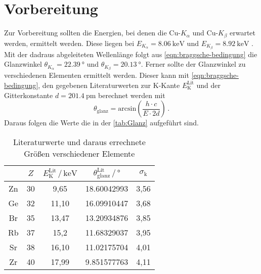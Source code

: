 \section{Vorbereitung}
\label{sec:vorb}
Zur Vorbereitung sollten die Energien, bei denen die Cu-$K_\alpha$ und Cu-$K_\beta$
erwartet werden, ermittelt werden. Diese liegen bei $E_{K_\alpha} = \SI{8.06}{\kilo\eV}$ und 
$E_{K_\beta} = \SI{8.92}{\kilo\eV}$ \cite{ld-didactic.de}. Mit der dadraus abgeleiteten Wellenlänge folgt aus
\autoref{eqn:braggsche-bedingung} die Glanzwinkel $\theta_{K_\alpha} = \SI{22.39}{\degree}$ 
und $\theta_{K_\beta} = \SI{20.13}{\degree}$.
Ferner sollte der Glanzwinkel zu verschiedenen Elementen ermittelt 
werden. Dieser kann mit \autoref{eqn:braggsche-bedingung}, den gegebenen Literaturwerten 
zur K-Kante $E_\text{K}^\text{Lit}$ \cite{wissen} und der Gitterkonstante 
$d = \SI{201.4}{\pico\meter}$ berechnet werden mit 
\begin{equation}
	\theta_\text{glanz} = \text{arcsin}\left(\frac{h \cdot c}{E \cdot 2d}\right) \, .
	\label{eqn:theta}
\end{equation}
Daraus folgen die Werte die in der \autoref{tab:Glanz} aufgeführt sind. 
\begin{table}
	\centering
	\caption{Literaturwerte und daraus errechnete Größen verschiedener Elemente}
	\label{tab:Glanz}
	\begin{tabular}{c c c c c}
		\toprule
		$ $ & $Z$ & $E_\text{K}^\text{Lit} \,/\, \si{\kilo\eV}$
		    & $\theta_\text{glanz}^\text{Lit} \,/\, \si{\degree}$ & 
		    $\sigma_\text{k}$\\
		    \midrule 
		Zn & 30 &  9,65 & 18.60042993 & 3,56 \\
		Ge & 32 & 11,10 & 16.09910447 & 3,68 \\
		Br & 35 & 13,47 & 13.20934876 & 3,85 \\
		Rb & 37 & 15,2 & 11.68329037 & 3,95 \\
		Sr & 38 & 16,10 & 11.02175704 & 4,01 \\
		Zr & 40 & 17,99 &  9.851577763 & 4,11 \\
		\bottomrule
	\end{tabular}
\end{table}

